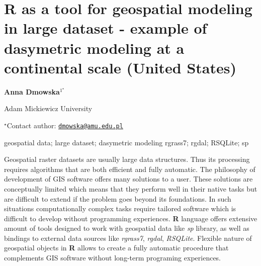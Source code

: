 \documentclass[\main/boa.tex]{subfiles}
\begin{document}
\pagestyle{empty}

\section{R as a tool for geospatial modeling in large dataset - example of
dasymetric modeling at a continental scale (United States)}

\begin{center}
  {\bf Anna Dmowska$^{1^\star}$}
\end{center}

\vskip 0.3cm

\begin{affiliations}
\begin{enumerate}
\begin{minipage}{0.915\textwidth}
\centering
\item Adam Mickiewicz University \\[-2pt]
\end{minipage}
\end{enumerate}
$^\star$Contact author: \href{mailto:dmowska@amu.edu.pl}{\nolinkurl{dmowska@amu.edu.pl}}\\
\end{affiliations}

\vskip 0.5cm

\begin{minipage}{0.915\textwidth}
\keywords geospatial data; large dataset; dasymetric modeling
\packages rgrass7; rgdal; RSQLite; sp
\end{minipage}

\vskip 0.8cm

Geospatial raster datasets are usually large data structures. Thus its
processing requires algorithms that are both efficient and fully
automatic. The philosophy of development of GIS software offers many
solutions to a user. These solutions are conceptually limited which
means that they perform well in their native tasks but are difficult to
extend if the problem goes beyond its foundations. In such situations
computationally complex tasks require tailored software which is
difficult to develop without programming experiences. \textbf{R}
language offers extensive amount of tools designed to work with
geospatial data like \emph{sp} library, as well as bindings to external
data sources like \emph{rgrass7}, \emph{rgdal}, \emph{RSQLite}. Flexible
nature of geospatial objects in \textbf{R} allows to create a fully
automatic procedure that complements GIS software without long-term
programing experiences.
\end{document}
